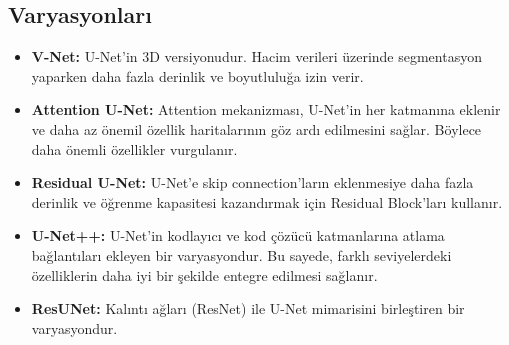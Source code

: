 \subsection{Varyasyonları}
\begin{itemize}
    \item \textbf{V-Net:} U-Net'in 3D versiyonudur. Hacim verileri üzerinde segmentasyon yaparken daha fazla derinlik ve boyutluluğa izin verir.
    \item \textbf{Attention U-Net:} Attention mekanizması, U-Net'in her katmanına eklenir ve daha az önemil özellik haritalarının göz ardı edilmesini sağlar. Böylece daha önemli özellikler vurgulanır.
    \item \textbf{Residual U-Net:} U-Net'e skip connection'ların eklenmesiye daha fazla derinlik ve öğrenme kapasitesi kazandırmak için Residual Block'ları kullanır.
    \item \textbf{U-Net++:} U-Net'in kodlayıcı ve kod çözücü katmanlarına atlama bağlantıları ekleyen bir varyasyondur. Bu sayede, farklı seviyelerdeki özelliklerin daha iyi bir şekilde entegre edilmesi sağlanır.
    \item \textbf{ResUNet:} Kalıntı ağları (ResNet) ile U-Net mimarisini birleştiren bir varyasyondur.
\end{itemize}

\newpage